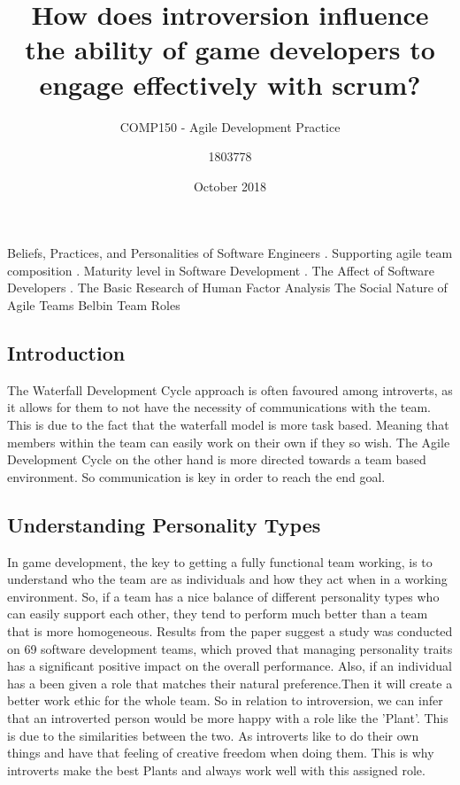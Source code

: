 \documentclass{scrartcl}
\title{How does introversion influence the ability of game developers to engage effectively with scrum?}
\subtitle{COMP150 - Agile Development Practice}
\author{1803778}
\date{October 2018}
\begin{document}
    \maketitle
    
    Beliefs, Practices, and Personalities of Software Engineers \cite{7809477}.
    Supporting agile team composition \cite{5071413}.
    Maturity level in Software Development \cite{7965314}.
    The Affect of Software Developers \cite{7166106}.
    The Basic Research of Human Factor Analysis \cite{4723148}
    The Social Nature of Agile Teams \cite{4599518}
    Belbin Team Roles \cite{Belbin01}
    
    \newpage
    \subsection{Introduction}
    The Waterfall Development Cycle approach is often favoured among introverts, as it allows for them to not have the necessity of communications with the team. This is due to the fact that the waterfall model is more task based. Meaning that members within the team can easily work on their own if they so wish. The Agile Development Cycle on the other hand is more directed towards a team based environment. So communication is key in order to reach the end goal.
    
    \subsection{Understanding Personality Types}
    In game development, the key to getting a fully functional team working, is to understand who the team are as individuals and how they act when in a working environment. So, if a team has a nice balance of different personality types who can easily support each other, they tend to perform much better than a team that is more homogeneous\cite{5071413}. Results from the paper suggest a study was conducted on 69 software development teams, which proved that managing personality traits has a significant positive impact on the overall performance. Also, if an individual has a been given a role that matches their natural preference.Then it will create a better work ethic for the whole team. So in relation to introversion, we can infer that an introverted person would be more happy with a role like the 'Plant'\cite{Belbin01}. This is due to the similarities between the two. As introverts like to do their own things and have that feeling of creative freedom when doing them. This is why introverts make the best Plants and always work well with this assigned role.
    
\end{document}
